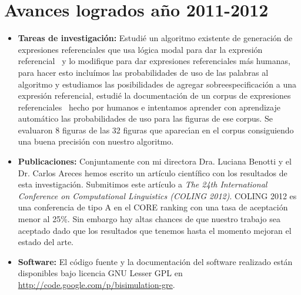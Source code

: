 \section{Avances logrados a\~no 2011-2012 }
\label{progreso}

\begin{itemize}
\item \textbf{Tareas de investigaci\'on:}
Estudi\'e un algoritmo existente de generaci\'on de expresiones referenciales que usa l\'ogica modal para dar la 
expresi\'on referencial~\cite{Areces2008} y lo modifique para dar expresiones referenciales m\'as humanas, para hacer 
esto inclu\'imos las probabilidades de uso de las palabras al algoritmo y estudiamos las posibilidades de agregar 
sobreespecificaci\'on a una expresi\'on referencial, estudi\'e la documentaci\'on de un corpus de expresiones 
referenciales~\cite{viethen-dale:2011:UCNLG+Eval} hecho por humanos e intentamos aprender con aprendizaje autom\'atico 
las probabilidades de uso para las figuras de ese corpus. Se evaluaron 8 figuras de las 32 figuras que aparec\'{\i}an en 
el corpus consiguiendo una buena precisi\'on con nuestro algoritmo. 
\item \textbf{Publicaciones:} 
Conjuntamente con mi directora Dra. Luciana Benotti y el Dr. Carlos Areces hemos escrito un art\'iculo cient\'ifico con los resultados de esta investigaci\'on. Submitimos este art\'iculo a \emph{The 24th International Conference on Computational Linguistics (COLING 2012)}. COLING 2012 es una conferencia de tipo A en el CORE ranking con una tasa de aceptaci\'on menor al 25\%. Sin embargo hay altas chances de que nuestro trabajo sea aceptado dado que los resultados que tenemos hasta el momento mejoran el estado del arte.    
\item \textbf{Software:} El c\'odigo fuente y la documentaci\'on del software realizado est\'an disponibles bajo licencia GNU Lesser GPL en \url{http://code.google.com/p/bisimulation-gre}.


\end{itemize}
